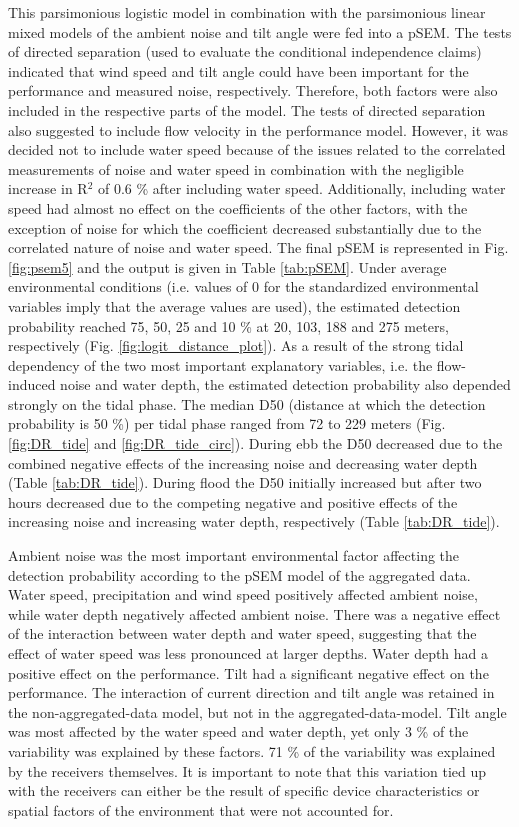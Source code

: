 \documentclass[doublespacing,linenumbers]{bmcart}
\begin{document}
This parsimonious logistic model in combination with the parsimonious linear mixed models of the ambient noise and tilt angle were fed into a pSEM. The tests of directed separation (used to evaluate the conditional independence claims) indicated that wind speed and tilt angle could have been important for the performance and measured noise, respectively. Therefore, both factors were also included in the respective parts of the model. The tests of directed separation also suggested to include flow velocity in the performance model. However, it was decided not to include water speed because of the issues related to the correlated measurements of noise and water speed in combination with the negligible increase in R$^{2}$ of 0.6 \% after including water speed. Additionally, including water speed had almost no effect on the coefficients of the other factors, with the exception of noise for which the coefficient decreased substantially due to the correlated nature of noise and water speed. The final pSEM is represented in Fig. \ref{fig:psem5} and the output is given in Table \ref{tab:pSEM}. Under average environmental conditions (i.e. values of 0 for the standardized environmental variables imply that the average values are used), the estimated detection probability reached 75, 50, 25 and 10 \% at 20, 103, 188 and 275 meters, respectively (Fig. \ref{fig:logit_distance_plot}). As a result of the strong tidal dependency of the two most important explanatory variables, i.e. the flow-induced noise and water depth, the estimated detection probability also depended strongly on the tidal phase. The median D50 (distance at which the detection probability is 50 \%) per tidal phase ranged from 72 to 229 meters (Fig. \ref{fig:DR_tide} and \ref{fig:DR_tide_circ}). During ebb the D50 decreased due to the combined negative effects of the increasing noise and decreasing water depth (Table \ref{tab:DR_tide}). During flood the D50 initially increased but after two hours decreased due to the competing negative and positive effects of the increasing noise and increasing water depth, respectively (Table \ref{tab:DR_tide}). 

Ambient noise was the most important environmental factor affecting the detection probability according to the pSEM model of the aggregated data. Water speed, precipitation and wind speed  positively affected ambient noise, while water depth negatively affected ambient noise. There was a negative effect of the interaction between water depth and water speed, suggesting that the effect of water speed was less pronounced at larger depths. Water depth had a positive effect on the performance. Tilt had a significant negative effect on the performance. The interaction of current direction and tilt angle was retained in the non-aggregated-data model, but not in the aggregated-data-model. Tilt angle was most affected by the water speed and water depth, yet only 3 \% of the variability was explained by these factors. 71 \% of the variability was explained by the receivers themselves. It is important to note that this variation tied up with the receivers can either be the result of specific device characteristics or spatial factors of the environment that were not accounted for.
\end{document}
